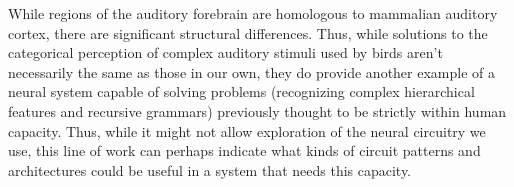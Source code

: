 While regions of the auditory forebrain are homologous to mammalian auditory cortex\cite{wang2010laminar}, there are significant structural differences. Thus, while solutions to the categorical perception of complex auditory stimuli used by birds aren't necessarily the same as those in our own, they do provide another example of a neural system capable of solving problems (recognizing complex hierarchical features and recursive grammars) previously thought to be strictly within human capacity. Thus, while it might not allow exploration of the neural circuitry we use, this line of work can perhaps indicate what kinds of circuit patterns and architectures could be useful in a system that needs this capacity.